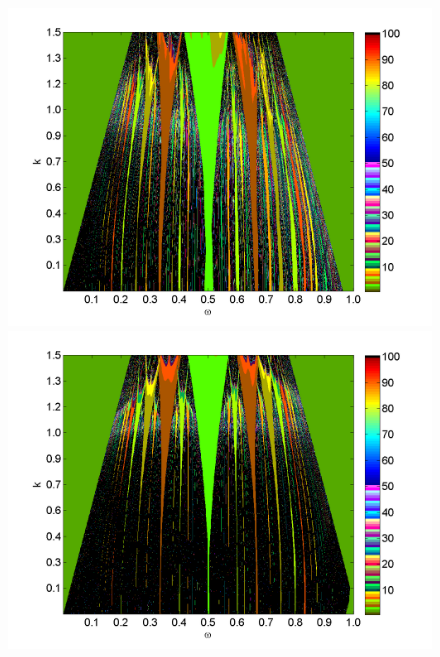 \begin{figure}[H]
\includegraphics[width=.5\textwidth]{figs/tongues_norm_1000_L_05.png}\hfill
\includegraphics[width=.5\textwidth]{figs/tongues_norm_1000_L_09.png}\\
\end{figure}

